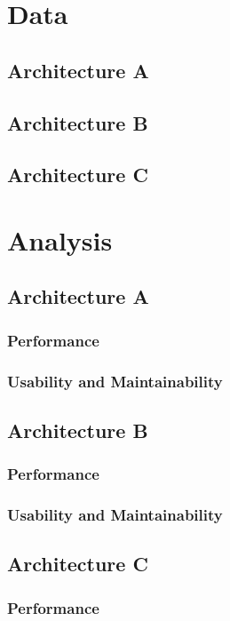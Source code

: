 \documentclass{article}
\begin{document}
\section{Data}
\subsection{Architecture A}

\subsection{Architecture B}

\subsection{Architecture C}

\section{Analysis}
\subsection{Architecture A}
\subsubsection{Performance}

\subsubsection{Usability and Maintainability}

\subsection{Architecture B}
\subsubsection{Performance}

\subsubsection{Usability and Maintainability}

\subsection{Architecture C}
\subsubsection{Performance}
\end{document}
